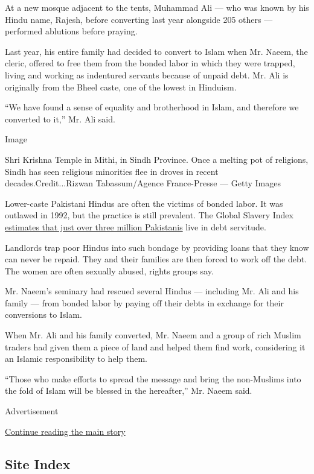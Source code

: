 At a new mosque adjacent to the tents, Muhammad Ali --- who was known by
his Hindu name, Rajesh, before converting last year alongside 205 others
--- performed ablutions before praying.

Last year, his entire family had decided to convert to Islam when Mr.
Naeem, the cleric, offered to free them from the bonded labor in which
they were trapped, living and working as indentured servants because of
unpaid debt. Mr. Ali is originally from the Bheel caste, one of the
lowest in Hinduism.

``We have found a sense of equality and brotherhood in Islam, and
therefore we converted to it,'' Mr. Ali said.

Image

Shri Krishna Temple in Mithi, in Sindh Province. Once a melting pot of
religions, Sindh has seen religious minorities flee in droves in recent
decades.Credit...Rizwan Tabassum/Agence France-Presse --- Getty Images

Lower-caste Pakistani Hindus are often the victims of bonded labor. It
was outlawed in 1992, but the practice is still prevalent. The Global
Slavery Index
\href{https://www.globalslaveryindex.org/2018/data/maps/\#prevalence}{estimates
that just over three million Pakistanis} live in debt servitude.

Landlords trap poor Hindus into such bondage by providing loans that
they know can never be repaid. They and their families are then forced
to work off the debt. The women are often sexually abused, rights groups
say.

Mr. Naeem's seminary had rescued several Hindus --- including Mr. Ali
and his family --- from bonded labor by paying off their debts in
exchange for their conversions to Islam.

When Mr. Ali and his family converted, Mr. Naeem and a group of rich
Muslim traders had given them a piece of land and helped them find work,
considering it an Islamic responsibility to help them.

``Those who make efforts to spread the message and bring the non-Muslims
into the fold of Islam will be blessed in the hereafter,'' Mr. Naeem
said.

Advertisement

\protect\hyperlink{after-bottom}{Continue reading the main story}

\hypertarget{site-index}{%
\subsection{Site Index}\label{site-index}}

